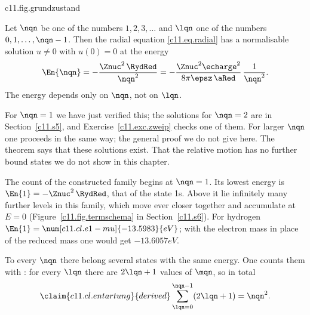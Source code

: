 \begin{tpcfigure}{c11.fig.grundzustand}
  \caption{The solution $u(x) = x\,e^{-x}$ of \eqref{c11.eq.grundzustand} in the potential, for $\Znuc = 1$. Heavy: the effective potential for $\lqn = 0$. Thin horizontal line: the energy $\En{1} = -\RydRed$. As is usual in such pictures, the function $u$ is drawn on this line as its base line; its height is scaled freely. It starts at zero, has its maximum at $\rad = \aRed$ and decays exponentially outwards.}
\end{tpcfigure}

\begin{theorem}\label{c11.thm.spektrum}
  Let $\nqn$ be one of the numbers $1, 2, 3, \ldots$ and $\lqn$ one of the numbers
  $0, 1, \ldots, \nqn - 1$. Then the radial equation \eqref{c11.eq.radial} has a
  normalisable solution $u \neq 0$ with $u(0) = 0$ at the energy
  \begin{equation}\label{c11.eq.energien}
    \En{\nqn} = -\frac{\Znuc^2\,\RydRed}{\nqn^2}
              = -\frac{\Znuc^2\echarge^2}{8\pi\epsz\,\aRed}\,\frac{1}{\nqn^2} .
  \end{equation}
  The energy depends only on $\nqn$, not on $\lqn$.
\end{theorem}

For $\nqn = 1$ we have just verified this; the solutions for $\nqn = 2$ are in
Section~\ref{c11.s5}, and Exercise~\ref{c11.exc.zweip} checks one of them. For larger
$\nqn$ one proceeds in the same way; the general proof we do not give
here. The theorem says that these solutions exist. That the relative motion has no further bound states we do not show in this
chapter.


The count of the constructed family begins at $\nqn = 1$. Its lowest energy is
$\En{1} = -\Znuc^2\,\RydRed$, that of the state 1s. Above it lie infinitely many
further levels in this family, which move ever closer together and accumulate at
$E = 0$ (Figure~\ref{c11.fig.termschema} in Section~\ref{c11.s6}). For hydrogen
$\En{1} = \num[c11.cl.e1-mu]{-13.5983}{eV}$; with the electron mass in place of the
reduced mass one would get $\num[c11.cl.e1-me]{-13.6057}{eV}$.

To every $\nqn$ there belong several states with the same energy. One counts them with
: for every $\lqn$ there are $2\lqn + 1$ values of $\mqn$, so in total
\begin{equation}\label{c11.eq.entartung}\claim{c11.cl.entartung}{derived}
  \sum_{\lqn = 0}^{\nqn - 1} (2\lqn + 1) = \nqn^2 .
\end{equation}

